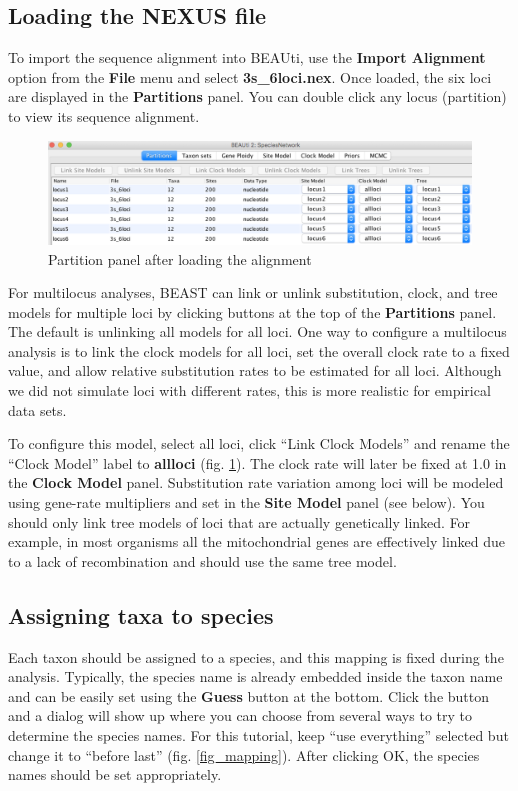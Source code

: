 \documentclass[11pt]{article}
\begin{document}
\subsection*{Loading the NEXUS file}

To import the sequence alignment into BEAUti, use the \textbf{Import Alignment} option from the \textbf{File} menu and select \textbf{3s\_6loci.nex}. Once loaded, the six loci are displayed in the \textbf{Partitions} panel. You can double click any locus (partition) to view its sequence alignment.

\begin{figure}[h]
\center
\includegraphics[width=1.0\textwidth]{figs/fig3_partition.png}
\caption{Partition panel after loading the alignment}
\label{fig_partition}
\end{figure}

For multilocus analyses, BEAST can link or unlink substitution, clock, and tree models for multiple loci by clicking buttons at the top of the \textbf{Partitions} panel. The default is unlinking all models for all loci.
One way to configure a multilocus analysis is to link the clock models for all loci, set the overall clock rate to a fixed value, and allow relative substitution rates to be estimated for all loci. Although we did not simulate loci with different rates, this is more realistic for empirical data sets.

To configure this model, select all loci, click ``Link Clock Models'' and rename the ``Clock Model'' label to \textbf{allloci} (fig. \ref{fig_partition}). The clock rate will later be fixed at 1.0 in the \textbf{Clock Model} panel. Substitution rate variation among loci will be modeled using gene-rate multipliers and set in the \textbf{Site Model} panel (see below).
You should only link tree models of loci that are actually genetically linked. For example, in most organisms all the mitochondrial genes are effectively linked due to a lack of recombination and should use the same tree model.

\subsection*{Assigning taxa to species}
Each taxon should be assigned to a species, and this mapping is fixed during the analysis. Typically, the species name is already embedded inside the taxon name and can be easily set using the \textbf{Guess} button at the bottom. Click the button and a dialog will show up where you can choose from several ways to try to determine the species names. For this tutorial, keep ``use everything'' selected but change it to ``before last'' (fig. \ref{fig_mapping}). After clicking OK, the species names should be set appropriately.
\end{document}
